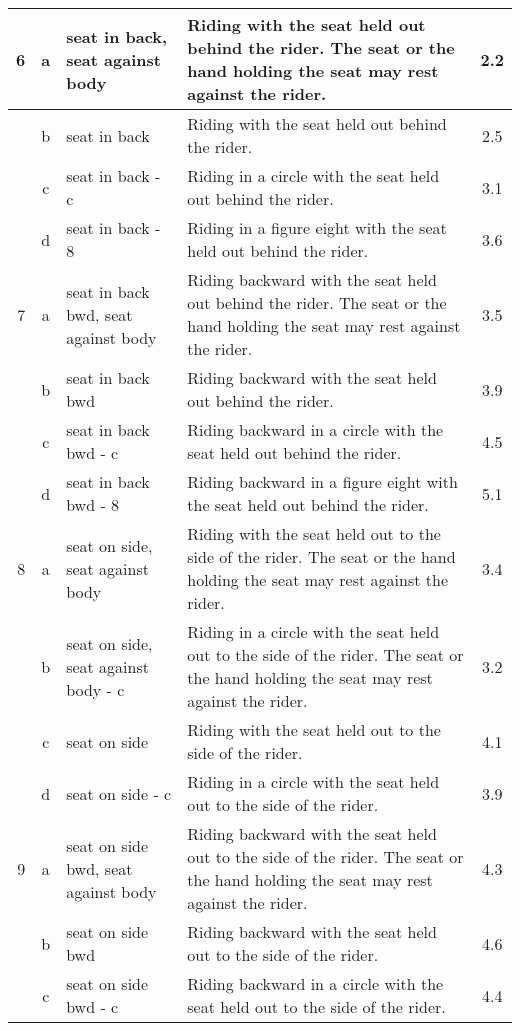 \begin{longtable}{|r|c|p{4cm}|p{8cm}|c|}
\hline
6 & a & seat in back, seat against body & Riding with the seat held out behind the rider. The seat or the hand holding the seat may rest against the rider. & 2.2 \\ 
\hline
  & b & seat in back  & Riding with the seat held out behind the rider. & 2.5 \\ 
\hline
  & c & seat in back - c  & Riding in a circle with the seat held out behind the rider. & 3.1 \\ 
\hline
  & d & seat in back - 8  & Riding in a figure eight with the seat held out behind the rider. & 3.6 \\ 
\hline
7 & a & seat in back bwd, seat against body & Riding backward with the seat held out behind the rider. The seat or the hand holding the seat may rest against the rider.  & 3.5 \\ 
\hline
  & b & seat in back bwd  & Riding backward with the seat held out behind the rider.  & 3.9 \\ 
\hline
  & c & seat in back bwd - c  & Riding backward in a circle with the seat held out behind the rider.  & 4.5 \\ 
\hline
  & d & seat in back bwd - 8  & Riding backward in a figure eight with the seat held out behind the rider.  & 5.1 \\ 
\hline
8 & a & seat on side, seat against body & Riding with the seat held out to the side of the rider. The seat or the hand holding the seat may rest against the rider. & 3.4 \\ 
\hline
  & b & seat on side, seat against body - c & Riding in a circle with the seat held out to the side of the rider. The seat or the hand holding the seat may rest against the rider. & 3.2 \\ 
\hline
  & c & seat on side  & Riding with the seat held out to the side of the rider. & 4.1 \\ 
\hline
  & d & seat on side - c  & Riding in a circle with the seat held out to the side of the rider. & 3.9 \\ 
\hline
9 & a & seat on side bwd, seat against body & Riding backward with the seat held out to the side of the rider. The seat or the hand holding the seat may rest against the rider.  & 4.3 \\ 
\hline
  & b & seat on side bwd  & Riding backward with the seat held out to the side of the rider.  & 4.6 \\ 
\hline
  & c & seat on side bwd - c  & Riding backward in a circle with the seat held out to the side of the rider.  & 4.4 \\ 

\end{longtable}
